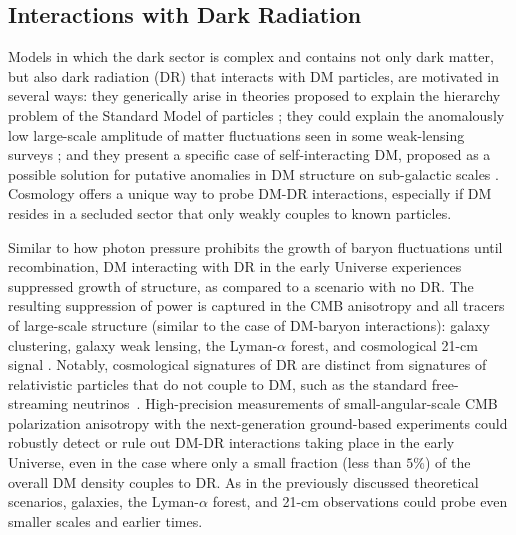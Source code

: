 \documentclass[12pt]{article}
\begin{document}
\vspace{-0.4cm}
\subsection{Interactions with Dark Radiation}

Models in which the dark sector is complex and contains not only dark matter, but also dark radiation (DR) that interacts with DM particles, are motivated in several ways: they generically arise in theories proposed to explain the hierarchy problem of the Standard Model of particles \cite{Arkani-Hamed:2016rle, Chacko:2018vss}; they could explain the anomalously low large-scale amplitude of matter fluctuations seen in some weak-lensing surveys \cite{Lesgourgues:2015wza,Chacko:2016kgg,Buen-Abad:2017gxg,Krall:2017xcw}; and they present a specific case of self-interacting DM, proposed as a possible solution for putative anomalies in DM structure on sub-galactic scales \cite{Tulin:2012wi,Tulin:2013teo,Kaplinghat:2015aga,Bullock:2017xww}. 
Cosmology offers a unique way to probe DM-DR interactions, especially if DM resides in a secluded sector that only weakly couples to known particles.

Similar to how photon pressure prohibits the growth of baryon fluctuations until recombination, DM interacting with DR in the early Universe experiences suppressed growth of structure, as compared to a scenario with no DR. 
The resulting suppression of power is captured in the CMB anisotropy and all tracers of large-scale structure (similar to the case of DM-baryon interactions): galaxy clustering, galaxy weak lensing, the Lyman-$\alpha$ forest, and cosmological 21-cm signal \cite{Boehm:2001hm,Cyr-Racine:2013fsa,Cyr-Racine:2015ihg}. 
Notably, cosmological signatures of DR are distinct from signatures of relativistic particles that do not couple to DM, such as the standard free-streaming neutrinos~\cite{Bashinsky:2003tk,Follin:2015hya,Baumann:2015rya}.
High-precision measurements of small-angular-scale CMB polarization anisotropy with the next-generation ground-based experiments could robustly detect or rule out DM-DR interactions taking place in the early Universe, even in the case where only a small fraction (less than $5\%$) of the overall DM density couples to DR. 
As in the previously discussed theoretical scenarios, galaxies, the Lyman-$\alpha$ forest, and 21-cm observations could probe even smaller scales and earlier times. 

\vspace{-0.4cm}
\end{document}
